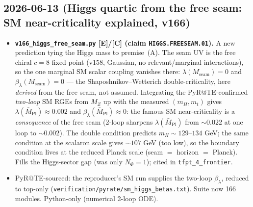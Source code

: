 \documentclass[11pt]{article}
\providecommand{\mE}{\textbf{[E]}}\providecommand{\mC}{\textbf{[C]}}
\begin{document}
\subsection*{2026-06-13 (Higgs quartic from the free seam: SM near-criticality explained, v166)}
\begin{itemize}
\item \textbf{\texttt{v166\_higgs\_free\_seam.py} \mE/\mC{} (claim \texttt{HIGGS.FREESEAM.01}).}
  A new prediction tying the Higgs mass to premise~(A). The seam UV is the free chiral
  $c{=}8$ fixed point (v158, Gaussian, no relevant/marginal interactions), so the one
  marginal SM scalar coupling vanishes there: $\lambda(M_{\mathrm{seam}})=0$ and
  $\beta_\lambda(M_{\mathrm{seam}})=0$ --- the Shaposhnikov--Wetterich double-criticality,
  here \emph{derived} from the free seam, not assumed. Integrating the PyR@TE-confirmed
  \emph{two-loop} SM RGEs from $M_Z$ up with the measured $(m_H,m_t)$ gives
  $\lambda(\bar M_{\mathrm{Pl}})\approx0.002$ and $\beta_\lambda(\bar M_{\mathrm{Pl}})\approx0$:
  the famous SM near-criticality is a \emph{consequence} of the free seam (2-loop sharpens
  $\lambda(\bar M_{\mathrm{Pl}})$ from ${\sim}0.022$ at one loop to ${\sim}0.002$). The double
  condition predicts $m_H\sim129$--$134$ GeV; the same condition at the scalaron scale gives
  ${\sim}107$ GeV (too low), so the boundary condition lives at the reduced Planck scale
  (seam $=$ horizon $=$ Planck). Fills the Higgs-sector gap (was only $N_\Phi=1$); cited in
  \texttt{tfpt\_4\_frontier}.
\item PyR@TE-sourced: the reproducer's SM run supplies the two-loop $\beta_\lambda$, reduced
  to top-only (\texttt{verification/pyrate/sm\_higgs\_betas.txt}). Suite now 166 modules.
  Python-only (numerical 2-loop ODE).
\end{itemize}
\end{document}
